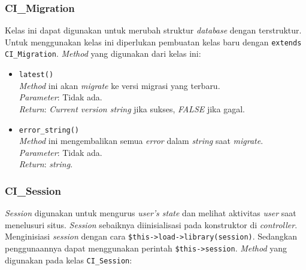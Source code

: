 \subsubsection{CI\_Migration}
Kelas ini dapat digunakan untuk merubah struktur \textit{database} dengan terstruktur. Untuk menggunakan kelas ini diperlukan pembuatan kelas baru dengan \texttt{extends CI\_Migration}. \textit{Method} yang digunakan dari kelas ini:

\begin{itemize}
	\item \texttt{latest()} \\
	\textit{Method} ini akan \textit{migrate} ke versi migrasi yang terbaru. \\
	\textit{Parameter}: Tidak ada. \\
	\textit{Return}: \textit{Current version string} jika sukses, \textit{FALSE} jika gagal.
	
	\item \texttt{error\_string()} \\ 
	\textit{Method} ini mengembalikan semua \textit{error} dalam \textit{string} saat \textit{migrate}. \\
	\textit{Parameter}: Tidak ada. \\
	\textit{Return}: \textit{string}.
\end{itemize}
\subsubsection{CI\_Session}
\textit{Session} digunakan untuk mengurus  \textit{user's state} dan melihat aktivitas \textit{user} saat menelusuri situs. \textit{Session} sebaiknya diinisialisasi pada konstruktor di \textit{controller}. Menginisiasi \textit{session} dengan cara \texttt{\$this->load->library(\textquotesingle session\textquotesingle)}. Sedangkan penggunaannya dapat menggunakan perintah \texttt{\$this->session}. \textit{Method} yang digunakan pada kelas \texttt{CI\_Session}:

